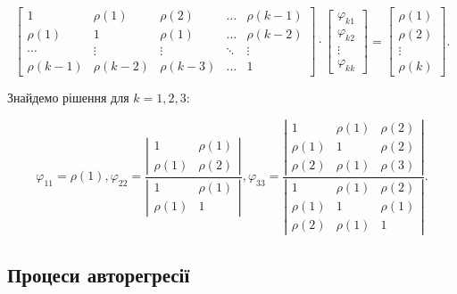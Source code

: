 \begin{equation}\label{eq:pacf}
\left[
\begin{array}{ccccc}
1 & \rho(1) & \rho(2) & \dots & \rho(k-1) \\
\rho(1) & 1 & \rho(1) & \dots & \rho(k-2) \\
\cdots & \vdots & \vdots & \ddots & \vdots \\
\rho(k-1) & \rho(k-2) & \rho(k-3) & \dots & 1
\end{array}
\right] \cdot
\left[
\begin{array}{c}
\varphi_{k1} \\
\varphi_{k2} \\
\vdots \\
\varphi_{kk}
\end{array}
\right]
=
\left[
\begin{array}{c}
\rho(1) \\
\rho(2) \\
\vdots \\
\rho(k)
\end{array}
\right].
\end{equation}

\vspace{1.5em}

Знайдемо рішення для $k = 1, 2, 3$:

\begin{equation}
\varphi_{11} = \rho(1), \varphi_{22} = \frac{\left|\begin{array}{cc} 1 & \rho(1) \\ \rho(1) & \rho(2) \end{array} \right|}{\left|\begin{array}{cc} 1 & \rho(1) \\ \rho(1) & 1 \end{array}\right|},
\varphi_{33} = \frac{\left|\begin{array}{ccc} 1 & \rho(1) & \rho(2) \\ \rho(1) & 1 & \rho(2) \\ \rho(2) & \rho(1) & \rho(3) \end{array}\right|}{\left|\begin{array}{ccc} 1 & \rho(1) & \rho(2) \\ \rho(1) & 1 & \rho(1) \\ \rho(2) & \rho(1) & 1 \end{array}\right|}.
\end{equation}

\subsection{Процеси авторегресії}

